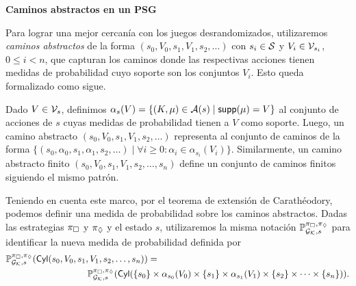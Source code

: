 

\textbf{Caminos abstractos en un PSG}

Para lograr una mejor cercanía con los juegos desrandomizados, utilizaremos
\emph{caminos abstractos} de la forma $(s_0,V_0,s_1,V_1,s_2,\ldots)$ con
$s_i\in\mathcal{S}$ y $V_i\in \mathcal{V}_{s_i}$, $0\leq i < n$, que capturan los caminos
donde las respectivas acciones tienen medidas de probabilidad cuyo soporte son
los conjuntos $V_i$. Esto queda formalizado como sigue.

Dado $V\in \mathcal{V}_s$, definimos
$\alpha_s(V)=\{(K,\mu)\in\mathcal{A}(s)\mid\textsf{supp}(\mu)=V\}$ al conjunto de
acciones de $s$ cuyas medidas de probabilidad tienen a $V$ como soporte. Luego,
un camino abstracto $(s_0,V_0,s_1,V_1,s_2,\ldots)$ representa al conjunto de
caminos de la forma $\{(s_0,\alpha_0,s_1,\alpha_1,s_2,\ldots)\mid \forall i\geq
	0\colon \alpha_i\in\alpha_{s_i}(V_i)\}$. Similarmente, un camino abstracto
finito $(s_0,V_0,s_1,V_1,s_2,\ldots,s_n)$ define un conjunto de caminos finitos
siguiendo el mismo patrón.

Teniendo en cuenta este marco, por el teorema de extensión de Carathéodory,
podemos definir una medida de probabilidad sobre los caminos abstractos. Dadas
las estrategias $\pi_{{\Box}}$ y $\pi_{{\Diamond}}$ y el estado $s$,
utilizaremos la misma notación
$\mathbb{P}^{\pi_{{\Box}},\pi_{{\Diamond}}}_{{\mathcal{G}_{\mathcal{K}}},s}$ para identificar la
nueva medida de probabilidad definida por
%
\begin{align*}
	\Prob^{\strat_{\maxplay},\strat_{\minplay}}_{\StochGK,s}(\Cyl(s_0,V_0,s_1,V_1,s_2,\ldots,s_n)) = {} \hspace{-8em} & \\
	& \Prob^{\strat_{\maxplay},\strat_{\minplay}}_{\StochGK,s}(\Cyl(\{s_0\}\times\alpha_{s_0}(V_0)\times\{s_1\}\times\alpha_{s_1}(V_1)\times\{s_2\}\times\cdots\times\{s_n\})).
\end{align*}
%

